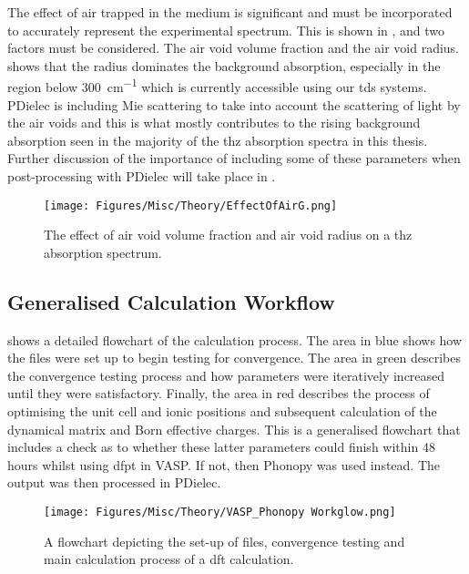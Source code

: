 The effect of air trapped in the medium is significant and must be incorporated to accurately represent the experimental spectrum. This is shown in , and two factors must be considered. The air void volume fraction and the air void radius.  shows that \DIFaddbegin {}\DIFaddend the radius dominates the background absorption, especially in the region below \SI{300}{cm^{-1}} which is currently accessible using our \acrshort{tds} systems. PDielec is including Mie scattering to take into account the scattering of light by the air voids and this is what mostly contributes to the rising background absorption seen in the majority of the \acrshort{thz} absorption spectra in this thesis. Further discussion of the importance of including some of these parameters when post\nobreakdash-processing with PDielec will take place in .

\begin{figure}
    \centering
    \texttt{[image: Figures/Misc/Theory/EffectOfAirG.png]}
    \captionsetup{font = footnotesize, justification = centering}
    \caption[The Effect of Air void Volume Fraction and Air Void Radius on a Calculated THz Absorption Spectrum]{The effect of air void volume fraction and air void radius on a \acrshort{thz} absorption spectrum.}
    \label{fig:AirEffect}
\end{figure}

\subsection{Generalised Calculation Workflow}
 shows a detailed flowchart of the calculation process. The area in blue shows how the files were set up to begin testing for convergence. The area in green describes the convergence testing process and how parameters were iteratively increased until they were satisfactory. Finally, the area in red describes the process of optimising the unit cell and ionic positions and subsequent calculation of the dynamical matrix and Born effective charges. This is a generalised flowchart that includes a check as to whether these latter parameters could finish within 48 hours whilst using \acrshort{dfpt} in VASP. If not, then Phonopy was used instead. The output was then processed in PDielec.

\begin{figure}
    \centering
    \texttt{[image: Figures/Misc/Theory/VASP\_Phonopy Workglow.png]}
    \captionsetup{font = footnotesize, justification = centering}
    \caption[A Flowchart Depicting the Calculation Process]{A flowchart depicting the set-up of files, convergence testing and main calculation process of a \acrshort{dft} calculation.}
    \label{fig:workflow}
\end{figure}

